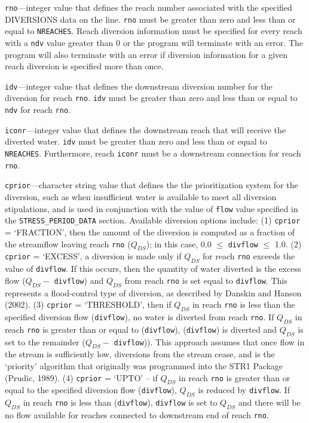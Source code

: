 \begin{description}
\item \texttt{rno}---integer value that defines the reach number associated with the specified DIVERSIONS data on the line. \texttt{rno} must be greater than zero and less than or equal to \texttt{NREACHES}.  Reach diversion information must be specified for every reach with a \texttt{ndv} value greater than 0 or the program will terminate with an error.  The program will also terminate with an error if diversion information for a given reach diversion is specified more than once.

\item \texttt{idv}---integer value that defines the downstream diversion number for the diversion for reach \texttt{rno}. \texttt{idv} must be greater than zero and less than or equal to \texttt{ndv} for reach \texttt{rno}.

\item \texttt{iconr}---integer value that defines the downstream reach that will receive the diverted water. \texttt{idv} must be greater than zero and less than or equal to \texttt{NREACHES}. Furthermore, reach  \texttt{iconr} must be a downstream connection for reach \texttt{rno}.

\item \texttt{cprior}---character string value that defines the the prioritization system for the diversion, such as when insufficient water is available to meet all diversion stipulations, and is used in conjunction with the value of \texttt{flow} value specified in the \texttt{STRESS\_PERIOD\_DATA} section. Available diversion options include:  (1) \texttt{cprior} = `FRACTION', then the amount of the diversion is computed as a fraction of the streamflow leaving reach \texttt{rno} ($Q_{DS}$); in this case, 0.0 $\le$ \texttt{divflow} $\le$ 1.0.  (2) \texttt{cprior} = `EXCESS', a diversion is made only if $Q_{DS}$ for reach \texttt{rno} exceeds the value of \texttt{divflow}. If this occurs, then the quantity of water diverted is the excess flow ($Q_{DS} -$ \texttt{divflow}) and $Q_{DS}$ from reach \texttt{rno} is set equal to \texttt{divflow}. This represents a flood-control type of diversion, as described by Danskin and Hanson (2002). (3) \texttt{cprior} = `THRESHOLD', then if $Q_{DS}$ in reach \texttt{rno} is less than the specified diversion flow (\texttt{divflow}), no water is diverted from reach \texttt{rno}. If $Q_{DS}$ in reach \texttt{rno} is greater than or equal to (\texttt{divflow}), (\texttt{divflow}) is diverted and $Q_{DS}$ is set to the remainder ($Q_{DS} -$ \texttt{divflow})). This approach assumes that once flow in the stream is sufficiently low, diversions from the stream cease, and is the `priority' algorithm that originally was programmed into the STR1 Package (Prudic, 1989).  (4) \texttt{cprior} = `UPTO' -- if $Q_{DS}$ in reach \texttt{rno} is greater than or equal to the specified diversion flow (\texttt{divflow}), $Q_{DS}$ is reduced by \texttt{divflow}. If $Q_{DS}$ in reach \texttt{rno} is less than (\texttt{divflow}), \texttt{divflow} is set to $Q_{DS}$ and there will be no flow available for reaches connected to downstream end of reach \texttt{rno}.

\end{description}
